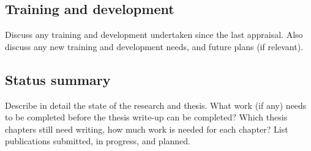 \documentclass[12pt,a4paper]{article}
\begin{document}
\subsection{Training and development}
Discuss any training and development undertaken since the last appraisal. Also discuss any new training and development needs, and future plans (if relevant). %

\subsection{Status summary}
Describe in detail the state of the research and thesis. What work (if any) needs to be completed before the thesis write-up can be completed? Which thesis chapters still need writing, how much work is needed for each chapter? List publications submitted, in progress, and planned. %


\end{document}
